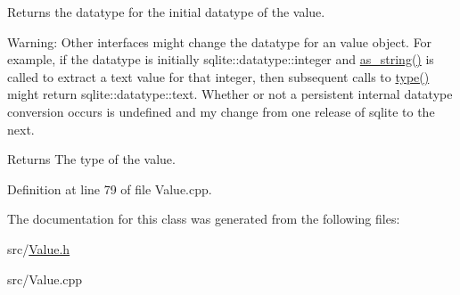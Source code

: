 Returns the datatype for the initial datatype of the value. 

Warning\-: Other interfaces might change the datatype for an value object. For example, if the datatype is initially sqlite\-::datatype\-::integer and \hyperlink{a00015_a6ce81cd7d007013cdc4ac5103ffa76f1}{as\-\_\-string()} is called to extract a text value for that integer, then subsequent calls to \hyperlink{a00015_a1dbe99607518010c9fd134b0816bb451}{type()} might return sqlite\-::datatype\-::text. Whether or not a persistent internal datatype conversion occurs is undefined and my change from one release of sqlite to the next. \begin{DoxyReturn}{Returns}
The type of the value. 
\end{DoxyReturn}


Definition at line 79 of file Value.\-cpp.



The documentation for this class was generated from the following files\-:\begin{DoxyCompactItemize}
\item 
src/\hyperlink{a00037}{Value.\-h}\item 
src/Value.\-cpp\end{DoxyCompactItemize}
